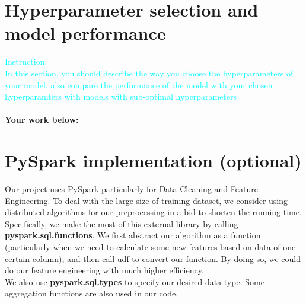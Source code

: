 \documentclass{article}
\begin{document}
\section{Hyperparameter selection and model performance}
\textcolor{cyan}{Instruction: \\
In this section, you should describe the way you choose the hyperparameters of your model, also compare the performance of the model with your chosen hyperparamters with models with sub-optimal hyperparameters}\\\\
\textbf{Your work below:}\\

\section{PySpark implementation (optional)}
Our project uses PySpark particularly for Data Cleaning and Feature Engineering. To deal with the large size of training dataset,
we consider using distributed algorithms for our preprocessing in a bid to shorten the running time.\\
Specifically, we make the most of this external library by calling \textbf{pyspark.sql.functions}. We first abstract our algorithm as a function
(particularly when we need to calculate some new features based on data of one certain column), and then call udf to convert our function.
By doing so, we could do our feature engineering with much higher efficiency.\\
We also use \textbf{pyspark.sql.types} to specify our desired data type.
Some aggregation functions are also used in our code.
\end{document}
